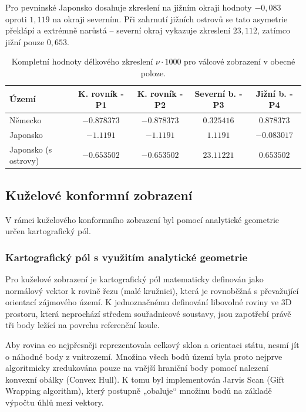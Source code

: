 Pro pevninské Japonsko dosahuje zkreslení na jižním okraji hodnoty $-0,083$ oproti $1,119$ na okraji severním. Při zahrnutí jižních ostrovů se tato asymetrie překlápí a extrémně narůstá – severní okraj vykazuje zkreslení $23,112$, zatímco jižní pouze $0,653$. 

\begin{table}[h!]
	\centering
	\renewcommand{\arraystretch}{1,3}
	\begin{tabular}{|l|c|c|c|c|
		}
		\hline
		\textbf{Území} & \textbf{K. rovník - P1} & \textbf{K. rovník - P2} & \textbf{Severní b. - P3} & \textbf{Jižní b. - P4} \\ \hline\hline
		Německo & $-0.878373$ & $-0.878373$ & $0.325416$ & $0.878373$ \\ \hline
		
		Japonsko & $-1.1191$ & $-1.1191$ & $1.1191$ & $-0.083017$ \\ \hline
		
		Japonsko (s ostrovy) & $-0.653502$ & $-0.653502$ & $23.11221$ & $0.653502$ \\ \hline
	\end{tabular}
	\vspace{0.2cm}
	\caption{Kompletní hodnoty délkového zkreslení $\nu \cdot 1000$ pro válcové zobrazení v obecné poloze.}
	\label{tab_vsechna_zkresleni_valec}
\end{table}

    
\subsection{Kuželové konformní zobrazení}
V rámci kuželového konformního zobrazení byl pomocí analytické geometrie určen kartografický pól. 




\subsubsection*{Kartografický pól s využitím analytické geometrie}

Pro kuželové zobrazení je kartografický pól matematicky definován jako normálový vektor k rovině řezu (malé kružnici), která je rovnoběžná s převažující orientací zájmového území. K jednoznačnému definování libovolné roviny ve 3D prostoru, která neprochází středem souřadnicové soustavy, jsou zapotřebí právě tři body ležící na povrchu referenční koule.

Aby rovina co nejpřesněji reprezentovala celkový sklon a orientaci státu, nesmí jít o náhodné body z vnitrozemí. Množina všech bodů území byla proto nejprve algoritmicky zredukována pouze na vnější hraniční body pomocí nalezení konvexní obálky (Convex Hull). K tomu byl  implementován Jarvis Scan (Gift Wrapping algorithm), který postupně „obaluje“ množinu bodů na základě výpočtu úhlů mezi vektory.

